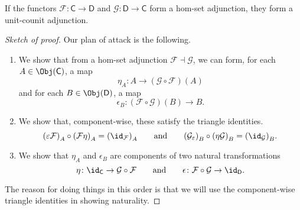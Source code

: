 \documentclass[main.tex]{subfiles}
\begin{document}
\begin{lemma}
  \label{lemma:hom-set_adjunction_implies_unit-counit_adjunction}
  If the functors $\mathcal{F}\colon \mathsf{C} \to \mathsf{D}$ and $\mathcal{G}\colon \mathsf{D} \to \mathsf{C}$ form a hom-set adjunction, they form a unit-counit adjunction.
\end{lemma}
\begin{proof}[Sketch of proof]
  Our plan of attack is the following.
  \begin{enumerate}
    \item We show that from a hom-set adjunction $\mathcal{F} \dashv \mathcal{G}$, we can form, for each $A \in \Obj(\mathsf{C})$, a map
      \begin{equation*}
        \eta_{A}\colon A \to (\mathcal{G} \circ \mathcal{F})(A)
      \end{equation*}
      and for each $B \in \Obj(\mathsf{D})$, a map
      \begin{equation*}
        \epsilon_{B}\colon (\mathcal{F} \circ \mathcal{G})(B) \to B.
      \end{equation*}

    \item We show that, component-wise, these satisfy the triangle identities.
      \begin{equation*}
        {(\varepsilon\mathcal{F})}_{A} \circ {(\mathcal{F}\eta)}_{A} = {(\id_{\mathcal{F}})}_{A}\qquad\text{and}\qquad {(\mathcal{G}_{\varepsilon})}_{B} \circ {(\eta\mathcal{G})}_{B} = {(\id_{\mathcal{G}})}_{B}.
      \end{equation*}

    \item We show that $\eta_{A}$ and $\epsilon_{B}$ are components of two natural transformations
      \begin{equation*}
        \eta\colon \id_{\mathsf{C}} \to \mathcal{G} \circ \mathcal{F} \qquad \text{and}\qquad \epsilon\colon \mathcal{F} \circ \mathcal{G} \to \id_{\mathsf{D}}.
      \end{equation*}
  \end{enumerate}
  The reason for doing things in this order is that we will use the component-wise triangle identities in showing naturality.
\end{proof}
\end{document}
